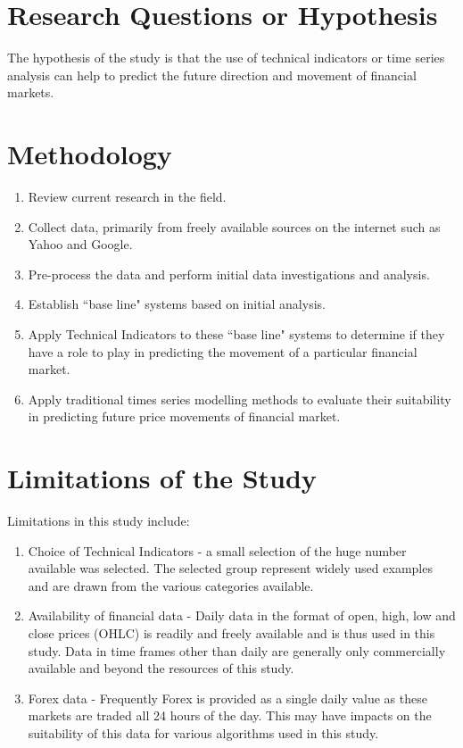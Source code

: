 

\section{Research Questions or Hypothesis}
The hypothesis of the study is that the use of technical indicators or time series analysis can help to predict the future direction and movement of financial markets.

\section{Methodology}

\begin{enumerate}
\item Review current research in the field.
\item Collect data, primarily from freely available sources on the internet such as Yahoo and Google.
\item Pre-process the data and perform initial data investigations and analysis.
\item Establish \textquotedblleft base line" systems based on initial analysis.
\item Apply Technical Indicators to these \textquotedblleft base line" systems to determine if they have a role to play in predicting the movement of a particular financial market.
\item Apply traditional times series modelling methods to evaluate their suitability in predicting future price movements of financial market.
\end{enumerate}


\section{Limitations of the Study}
Limitations in this study include:
\begin{enumerate}
\item Choice of Technical Indicators - a small selection of the huge number available was selected. The selected group represent widely used examples and are drawn from the various categories available.
\item Availability of financial data - Daily data in the format of open, high, low and close prices (OHLC) is readily and freely available and is thus used in this study. Data in time frames other than daily are generally only commercially available and beyond the resources of this study.
\item Forex data -  Frequently Forex is provided as a single daily value as these markets are traded all 24 hours of the day. This may have impacts on the suitability of this data for various algorithms used in this study. 
\end{enumerate}


